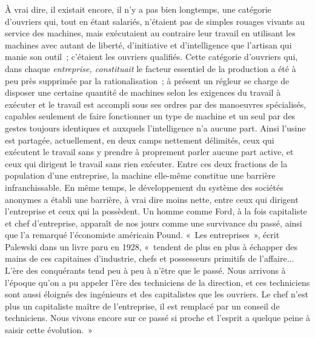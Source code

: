 \documentclass[french,twoside]{book} %
\begin{document}
À vrai dire, il existait encore, il n'y a pas bien longtemps, une catégorie d'ouvriers qui, tout en étant salariés, n'étaient pas de simples rouages vivants au service des machines, mais exécutaient au contraire leur travail en utilisant les machines avec autant de liberté, d'initiative et d'intelligence que l'artisan qui manie son outil ; c'étaient les ouvriers qualifiés. Cette catégorie d'ouvriers qui, dans chaque {\itshape entreprise, constituait} le facteur essentiel de la production a été à peu près supprimée par la rationalisation ; à présent un régleur se charge de disposer une certaine quantité de machines selon les exigences du travail à exécuter et le travail est accompli sous ses ordres par des manoeuvres spécialisés, capables seulement de faire fonctionner un type de machine et un seul par des gestes toujours identiques et auxquels l'intelligence n'a aucune part. Ainsi l'usine est partagée, actuellement, en deux camps nettement délimités, ceux qui exécutent le travail sans y prendre à proprement parler aucune part active, et ceux qui dirigent le travail sans rien exécuter. Entre ces deux fractions de la population d'une entreprise, la machine elle-même constitue une barrière infranchissable. En même temps, le développement du système des sociétés anonymes a établi une barrière, à vrai dire moins nette, entre ceux qui dirigent l'entreprise et ceux qui la possèdent. Un homme comme Ford, à la fois capitaliste et chef d'entreprise, apparaît de nos jours comme une survivance du passé, ainsi que l'a remarqué l'économiste américain Pound. « Les entreprises », écrit Palewski dans un livre paru en 1928, « tendent de plus en plus à échapper des mains de ces capitaines d'industrie, chefs et possesseurs primitifs de l'affaire... L'ère des conquérants tend peu à peu à n'être que le passé. Nous arrivons à l'époque qu'on a pu appeler l'ère des techniciens de la direction, et ces techniciens sont aussi éloignés des ingénieurs et des capitalistes que les ouvriers. Le chef n'est plus un capitaliste maître de l'entreprise, il est remplacé par un conseil de techniciens. Nous vivons encore sur ce passé si proche et l'esprit a quelque peine à saisir cette évolution. »\par
\end{document}
